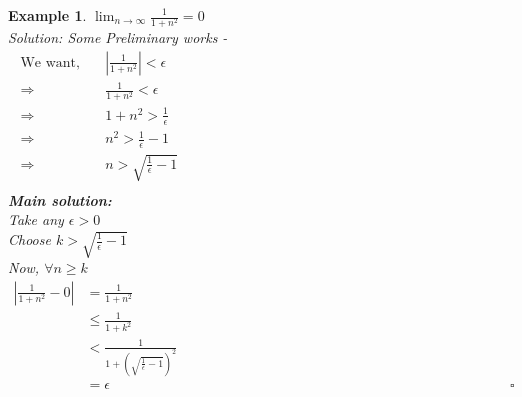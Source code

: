 \documentclass{article}
\newtheorem{example}{Example}[section]
\newcommand{\Rw}{\Rightarrow}
\newcommand{\hs}{\hspace}
\begin{document}
\begin{example}
    $\lim_{n\to\infty}\frac{1}{1+n^2}=0$\\
    \textit{Solution:} Some Preliminary works - \\
    \begin{align*}
        \text{We want,}\quad & |\frac{1}{1+n^2}|<\epsilon \hs{10cm} \\
        \Rw  \;              & \frac{1}{1+n^2}<\epsilon             \\
        \Rw  \;              & 1+n^2 > \frac{1}{\epsilon}           \\
        \Rw  \;              & n^2 > \frac{1}{\epsilon}-1           \\
        \Rw  \;              & n> \sqrt{\frac{1}{\epsilon}-1}       \\
    \end{align*}
    \textbf{\large Main solution:}\\
    Take any $\epsilon>0$\\
    Choose $k>\sqrt{\frac{1}{\epsilon}-1}$\\
    Now, $\forall n \geq k$\\
    \begin{align*}
        |\frac{1}{1+n^2}-0| & =\frac{1}{1+n^2}\hs{7cm}                                 \\
                            & \leq \frac{1}{1+k^2}                                     \\
                            & < \frac{1}{1+\left(\sqrt{\frac{1}{\epsilon}-1}\right)^2} \\
                            & =\epsilon                          \hs{12cm}\square      \\
    \end{align*}
\end{example}
\end{document}
